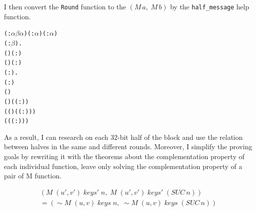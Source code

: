 \documentclass{article}
\begin{document}
I then convert the \verb|Round| function to the $(M \,a,\; M \,b)$ by the \verb|half_message| help function.

\begin{alltt}
\HOLTokenTurnstile{} \HOLSymConst{\HOLTokenForall{}}( :\ensuremath{\alpha}  \HOLTokenMap{} \ensuremath{\beta} \HOLTokenMap{} \ensuremath{\alpha} ) ( :\ensuremath{\alpha} ) ( :\ensuremath{\alpha} )
       ( :\ensuremath{\beta} ).
       (\HOLSymConst{,})  ( :) \HOLSymConst{=}  \HOLSymConst{\HOLTokenConj{}}
       (\HOLSymConst{,})  ( :) \HOLSymConst{=}  \HOLSymConst{\HOLTokenConj{}}
     \HOLSymConst{\HOLTokenForall{}}( :).
       ( :) \HOLSymConst{\HOLTokenLeq{}}  \HOLSymConst{\HOLTokenImp{}}
         (\HOLSymConst{,})   \HOLSymConst{=}
         (\HOLSymConst{,})  ( \HOLSymConst{\ensuremath{-}} ( :)) \HOLSymConst{\HOLTokenEor{}}
        (  (\HOLSymConst{,})  ( \HOLSymConst{\ensuremath{-}} ( :)))
         ( ( \HOLSymConst{\ensuremath{-}} ( :)) )
\end{alltt}

As a result, I can research on each 32-bit
half of the block and use the relation between halves in the same and different rounds. Moreover, I simplify the proving goals by rewriting it with the theorems about the complementation
property of each individual function, leave only solving the complementation property of a pair of M function.

\begin{multline*}
(M \; (u', v') \; keys' \; n, \; M \; (u', v') \; keys' \; (SUC \, n)) \\
= (\sim M \; (u, v) \; keys \; n, \; \sim M \; (u, v) \; keys \; (SUC \, n))
\end{multline*}
\end{document}
